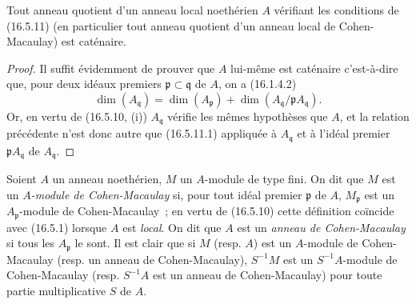 \begin{corollary}[16.5.12]
\label{0.16.5.12-fr}
Tout anneau quotient d'un anneau local noethérien $A$ vérifiant les conditions
de \textup{(16.5.11)} (en particulier tout anneau quotient d'un anneau local de
Cohen-Macaulay) est caténaire.
\end{corollary}

\begin{proof}
Il suffit évidemment de prouver que $A$ lui-même est caténaire c'est-à-dire
que, pour deux idéaux premiers $\mathfrak{p}\subset\mathfrak{q}$ de $A$, on a
(16.1.4.2)
\[
  \dim(A_{\mathfrak{q}})
  =\dim(A_{\mathfrak{p}})
  +\dim(A_{\mathfrak{q}}/\mathfrak{p}A_{\mathfrak{q}}).
\]
Or, en vertu de (16.5.10, (i)) $A_{\mathfrak{q}}$ vérifie les mêmes
hypothèses que $A$, et la relation précédente n'est donc autre que
(16.5.11.1) appliquée à $A_{\mathfrak{q}}$ et à l'idéal premier
$\mathfrak{p}A_{\mathfrak{q}}$ de $A_{\mathfrak{q}}$.
\end{proof}

\begin{env}[16.5.13]
\label{0.16.5.13-fr}
Soient $A$ un anneau noethérien, $M$ un $A$-module de type fini. On dit que
$M$ est un \emph{$A$-module de Cohen-Macaulay} si, pour tout idéal premier
$\mathfrak{p}$ de $A$, $M_{\mathfrak{p}}$ est un $A_{\mathfrak{p}}$-module
de Cohen-Macaulay~; en vertu de (16.5.10) cette définition coïncide avec
(16.5.1) lorsque $A$ est \emph{local}. On dit que $A$ est un
\emph{anneau de Cohen-Macaulay} si tous les $A_{\mathfrak{p}}$ le sont. Il est
clair que si $M$ (resp. $A$) est un $A$-module de Cohen-Macaulay (resp. un
anneau de Cohen-Macaulay), $S^{-1}M$ est un $S^{-1}A$-module de Cohen-Macaulay
(resp. $S^{-1}A$ est un anneau de Cohen-Macaulay) pour toute partie
multiplicative $S$ de $A$.
\end{env}
